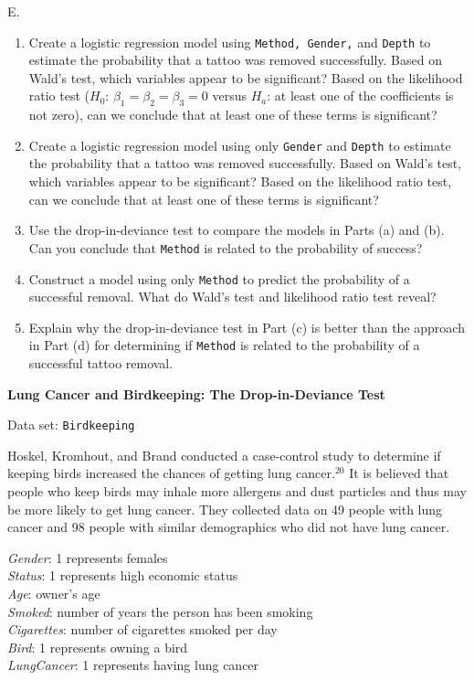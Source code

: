 \documentclass[
]{report}
\newcounter{excount}
\renewcommand{\theexcount}{E\arabic{excount}}
\begin{document}
\begin{list}{\theexcount.}{ \setlength{\itemsep}{1.2em}}
  \begin{enumerate}
    \item Create a logistic regression model using \texttt{Method, Gender,} and \texttt{Depth} to estimate the probability that a tattoo was removed successfully. Based on Wald’s test, which variables appear to be significant? Based on the likelihood ratio test ($H_0$: $\beta_1 = \beta_2 = \beta_3 = 0$ versus $H_a$: at least one of the coefficients is not zero), can we conclude that at least one of these terms is significant?
    \item Create a logistic regression model using only \texttt{Gender} and \texttt{Depth} to estimate the probability that a tattoo was removed successfully. Based on Wald’s test, which variables appear to be significant? Based on the likelihood ratio test, can we conclude that at least one of these terms is significant?
    \item Use the drop-in-deviance test to compare the models in Parts (a) and (b). Can you conclude that \texttt{Method} is related to the probability of success?
    \item Construct a model using only \texttt{Method} to predict the probability of a successful removal. What do Wald’s test and likelihood ratio test reveal?
    \item Explain why the drop-in-deviance test in Part (c) is better than the approach in Part (d) for determining if \texttt{Method} is related to the probability of a successful tattoo removal.
  \end{enumerate}

  \item \textbf{Lung Cancer and Birdkeeping: The Drop-in-Deviance Test}

Data set: \texttt{Birdkeeping}

Hoskel, Kromhout, and Brand conducted a case-control study to determine if keeping birds increased the chances of getting lung cancer.$^{20}$ It is believed that people who keep birds may inhale more allergens and dust particles and thus may be more likely to get lung cancer. They collected data on 49 people with lung cancer and 98 people with similar demographics who did not have lung cancer.

\textit{Gender}: 1 represents females \\
\textit{Status}: 1 represents high economic status \\
\textit{Age}: owner’s age \\
\textit{Smoked}: number of years the person has been smoking \\
\textit{Cigarettes}: number of cigarettes smoked per day \\
\textit{Bird}: 1 represents owning a bird \\
\textit{LungCancer}: 1 represents having lung cancer


\end{list}
\end{document}
